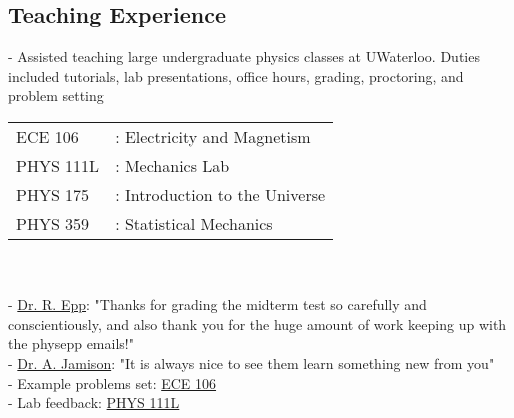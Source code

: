 \documentclass[margin,line]{res}
\begin{document}
\begin{resume}
\section{\sc Teaching Experience}
- Assisted teaching large undergraduate physics classes at UWaterloo. Duties included tutorials, lab presentations, office hours, grading, proctoring, and problem setting\\
\begin{tabular}{ll}
    \textsf{ECE 106} & : Electricity and Magnetism \\
    \textsf{PHYS 111L} & : Mechanics Lab \\
    \textsf{PHYS 175} & : Introduction to the Universe \\
    \textsf{PHYS 359} & : Statistical Mechanics 
\end{tabular}\\\\
- \href{https://uwaterloo.ca/astrophysics-centre/people-profiles/richard-epp}{\sffamily Dr. R. Epp}: "Thanks for grading the midterm test so carefully and conscientiously, and also thank you for the huge amount of work keeping up with the physepp emails!"\\
- \href{https://uwaterloo.ca/physics-astronomy/profile/alanj}{\sffamily Dr. A. Jamison}: "It is always nice to see them learn something new from you"\\
- Example problems set: \href{https://sriramgkn.github.io/docs/ECE106_Problems.pdf}{\sffamily ECE 106}\\
- Lab feedback: \href{https://sriramgkn.github.io/docs/phys111L_feedback.pdf}{\sffamily PHYS 111L}






\end{resume}
\end{document}
